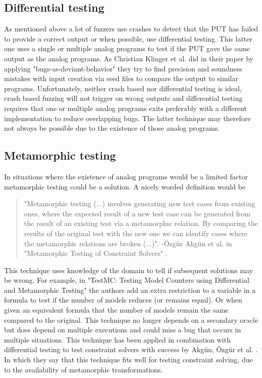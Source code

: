 \subsection{Differential testing}
\label{fuzzing:DifferentialTesting}
As mentioned above a lot of fuzzers use crashes to detect that the PUT has failed to provide a correct output or when possible, use differential testing. This latter one uses a single or multiple analog programs to test if the PUT gave the same output as the analog programs. As Christian Klinger et al. did in their paper \cite{48klinger2019differentially} by applying "bugs-as-deviant-behavior" they try to find precision and soundness mistakes with input creation via seed files to compare the output to similar programs. 
Unfortunately, neither crash based nor differential testing is ideal, crash based fuzzing will not trigger on wrong outputs and differential testing requires that one or multiple analog programs exits preferably with a different implementation to reduce overlapping bugs. The latter technique may therefore not always be possible due to the existence of those analog programs.

\subsection{Metamorphic testing}
\label{fuzzing:MetamorphicTesting}
In situations where the existence of analog programs would be a limited factor metamorphic testing could be a solution. A nicely worded definition would be 

\begin{quote}
	\label{quote:MetaMorphic}
	"Metamorphic testing (...) involves generating new test cases from existing ones, where the expected result of a new test case can be generated from the result of an existing test via a metamorphic relation. By comparing the results of the
	original test with the new one we can identify cases where the metamorphic relations are broken (...)".
	\newline
	-\"{O}zg\"{u}r Akg\"{u}n et al. in "Metamorphic Testing of Constraint Solvers" \cite{50akgun2018metamorphic}.
\end{quote}

\noindent This technique uses knowledge of the domain to tell if subsequent solutions may be wrong. For example, in "TestMC: Testing Model Counters using Differential and Metamorphic Testing" \cite{49usman2020testmc} the authors add an extra restriction to a variable in a formula to test if the number of models reduces (or remains equal). Or when given an equivalent formula that the number of models remain the same compared to the original. This technique no longer depends on a secondary oracle but does depend on multiple executions and could miss a bug that occurs in multiple situations. This technique has been applied in combination with differential testing to test constraint solvers with success by Akg{\"u}n, {\"O}zg{\"u}r et al. \cite{50akgun2018metamorphic}. In which they say that this technique fits well for testing constraint solving, due to the availability of metamorphic transformations.

